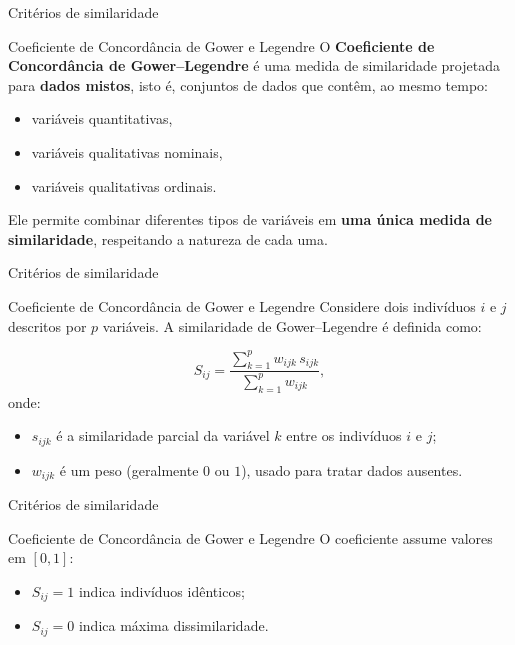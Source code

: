 \documentclass[
  ignorenonframetext,
  aspectratio=169,
]{beamer}
\providecommand{\tightlist}{%
  \setlength{\itemsep}{0pt}\setlength{\parskip}{0pt}}
\begin{document}
\begin{frame}{Critérios de similaridade}
\label{crituxe9rios-de-similaridade-6}
\begin{block}{Coeficiente de Concordância de Gower e Legendre}
\label{coeficiente-de-concorduxe2ncia-de-gower-e-legendre}
O \textbf{Coeficiente de Concordância de Gower--Legendre} é uma medida
de similaridade projetada para \textbf{dados mistos}, isto é, conjuntos
de dados que contêm, ao mesmo tempo:

\begin{itemize}
\tightlist
\item
  variáveis quantitativas,
\item
  variáveis qualitativas nominais,
\item
  variáveis qualitativas ordinais.
\end{itemize}

Ele permite combinar diferentes tipos de variáveis em \textbf{uma única
medida de similaridade}, respeitando a natureza de cada uma.
\end{block}
\end{frame}

\begin{frame}{Critérios de similaridade}
\label{crituxe9rios-de-similaridade-7}
\begin{block}{Coeficiente de Concordância de Gower e Legendre}
\label{coeficiente-de-concorduxe2ncia-de-gower-e-legendre-1}
Considere dois indivíduos \(i\) e \(j\) descritos por \(p\) variáveis. A
similaridade de Gower--Legendre é definida como:

\[
S_{ij}
=
\dfrac{\sum_{k=1}^{p} w_{ijk}\, s_{ijk}}
{\sum_{k=1}^{p} w_{ijk}},
\] onde:

\begin{itemize}
\tightlist
\item
  \(s_{ijk}\) é a similaridade parcial da variável \(k\) entre os
  indivíduos \(i\) e \(j\);
\item
  \(w_{ijk}\) é um peso (geralmente \(0\) ou \(1\)), usado para tratar
  dados ausentes.
\end{itemize}
\end{block}
\end{frame}

\begin{frame}{Critérios de similaridade}
\label{crituxe9rios-de-similaridade-8}
\begin{block}{Coeficiente de Concordância de Gower e Legendre}
\label{coeficiente-de-concorduxe2ncia-de-gower-e-legendre-2}
O coeficiente assume valores em \([0,1]\):

\begin{itemize}
\tightlist
\item
  \(S_{ij} = 1\) indica indivíduos idênticos;
\item
  \(S_{ij} = 0\) indica máxima dissimilaridade.
\end{itemize}
\end{block}
\end{frame}
\end{document}
